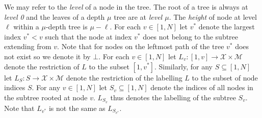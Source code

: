 \documentclass{article}
\theoremstyle{definition}
\begin{document}
We may refer to the \emph{level} of a node in the tree. The root of a tree is always at \emph{level 0} and the leaves of a depth $\mu$ tree are at \emph{level $\mu$}. The \emph{height} of node at level $\ell$ within a $\mu$-depth tree is $\mu - \ell$. For each $v \in [1,N]$ let $v^*$ denote the largest index $v^* < v$ such that the node at index $v^*$ does not belong to the subtree extending from $v$. Note that for nodes on the leftmost path of the tree $v^*$ does not exist so we denote it by $\bot$. For each $v \in [1,N]$ let $L_v:[1,v] \rightarrow \mathcal{X} \times \mathcal{M}$ denote the restriction of $L$ to the subset $[1,v^*]$. 
Similarly, for any $S \subseteq [1,N]$ let $L_S: S \rightarrow \mathcal{X} \times \mathcal{M}$ denote the restriction of the labelling $L$ to the subset of node indices $S$. For any $v \in [1, N]$ let $S_v \subseteq [1,N]$ denote the indices of all nodes in the subtree rooted at node $v$. $L_{S_v}$ thus denotes the labelling of the subtree $S_v$. Note that $L_{v^*}$ is not the same as $L_{S_{v^*}}$. 
\end{document}
